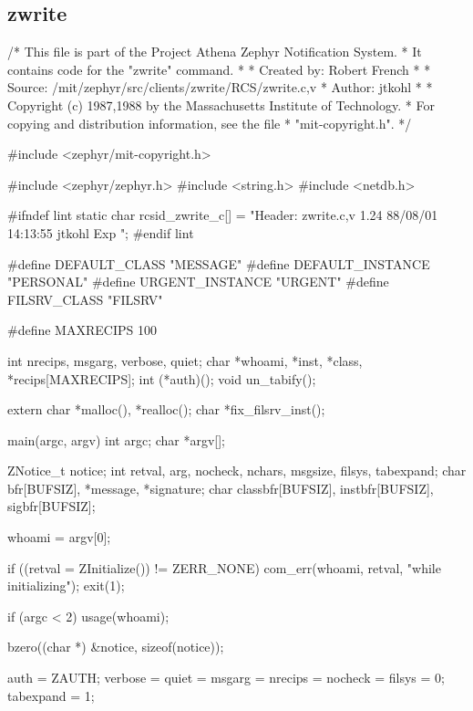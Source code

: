 %
\subsection{zwrite}
\label{ex-zwrite}

\begin{code}
/* This file is part of the Project Athena Zephyr Notification System.
 * It contains code for the "zwrite" command.
 *
 *      Created by:     Robert French
 *
 *      Source: /mit/zephyr/src/clients/zwrite/RCS/zwrite.c,v 
 *      Author: jtkohl 
 *
 *      Copyright (c) 1987,1988 by the Massachusetts Institute of Technology.
 *      For copying and distribution information, see the file
 *      "mit-copyright.h". 
 */

#include <zephyr/mit-copyright.h>

#include <zephyr/zephyr.h>
#include <string.h>
#include <netdb.h>

#ifndef lint
static char rcsid_zwrite_c[] =
 "Header: zwrite.c,v 1.24 88/08/01 14:13:55 jtkohl Exp ";
#endif lint

#define DEFAULT_CLASS "MESSAGE"
#define DEFAULT_INSTANCE "PERSONAL"
#define URGENT_INSTANCE "URGENT"
#define FILSRV_CLASS "FILSRV"

#define MAXRECIPS 100

int nrecips, msgarg, verbose, quiet;
char *whoami, *inst, *class, *recips[MAXRECIPS];
int (*auth)();
void un_tabify();

extern char *malloc(), *realloc();
char *fix_filsrv_inst();

main(argc, argv)
    int argc;
    char *argv[];
{
    ZNotice_t notice;
    int retval, arg, nocheck, nchars, msgsize, filsys, tabexpand;
    char bfr[BUFSIZ], *message, *signature;
    char classbfr[BUFSIZ], instbfr[BUFSIZ], sigbfr[BUFSIZ];
        
    whoami = argv[0];

    if ((retval = ZInitialize()) != ZERR_NONE) {
        com_err(whoami, retval, "while initializing");
        exit(1);
    } 

    if (argc < 2)
        usage(whoami);

    bzero((char *) &notice, sizeof(notice));

    auth = ZAUTH;
    verbose = quiet = msgarg = nrecips = nocheck = filsys = 0;
    tabexpand = 1;

}
\end{code}
